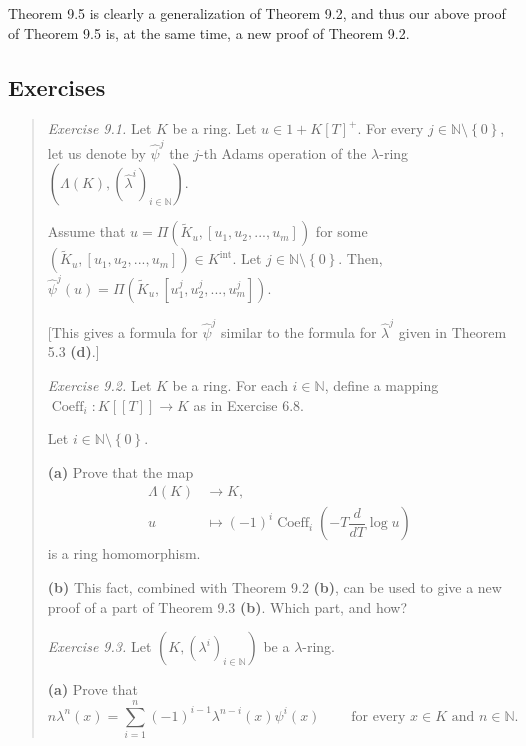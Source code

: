 \documentclass[numbers=enddot,12pt,final,onecolumn,notitlepage]{scrartcl}%
\begin{document}
Theorem 9.5 is clearly a generalization of Theorem 9.2, and thus our above
proof of Theorem 9.5 is, at the same time, a new proof of Theorem 9.2.

\subsection{Exercises}

\begin{quotation}
\textit{Exercise 9.1.} Let $K$ be a ring. Let $u\in1+K\left[  T\right]  ^{+}$.
For every $j\in\mathbb{N}\setminus\left\{  0\right\}  $, let us denote by
$\widehat{\psi}^{j}$ the $j$-th Adams operation of the $\lambda$-ring $\left(
\Lambda\left(  K\right)  ,\left(  \widehat{\lambda}^{i}\right)  _{i\in
\mathbb{N}}\right)  $.

Assume that $u=\Pi\left(  \widetilde{K}_{u},\left[  u_{1},u_{2},...,u_{m}%
\right]  \right)  $ for some $\left(  \widetilde{K}_{u},\left[  u_{1}%
,u_{2},...,u_{m}\right]  \right)  \in K^{\operatorname*{int}}$. Let
$j\in\mathbb{N}\setminus\left\{  0\right\}  $. Then, $\widehat{\psi}%
^{j}\left(  u\right)  =\Pi\left(  \widetilde{K}_{u},\left[  u_{1}^{j}%
,u_{2}^{j},...,u_{m}^{j}\right]  \right)  $.

[This gives a formula for $\widehat{\psi}^{j}$ similar to the formula for
$\widehat{\lambda}^{j}$ given in Theorem 5.3 \textbf{(d)}.]

\textit{Exercise 9.2.} Let $K$ be a ring. For each $i\in\mathbb{N}$, define a
mapping $\operatorname*{Coeff}\nolimits_{i}:K\left[  \left[  T\right]
\right]  \rightarrow K$ as in Exercise 6.8.

Let $i\in\mathbb{N}\setminus\left\{  0\right\}  $.

\textbf{(a)} Prove that the map%
\begin{align*}
\Lambda\left(  K\right)   &  \rightarrow K,\\
u  &  \mapsto\left(  -1\right)  ^{i}\operatorname*{Coeff}\nolimits_{i}\left(
-T\dfrac{d}{dT}\log u\right)
\end{align*}
is a ring homomorphism.

\textbf{(b)} This fact, combined with Theorem 9.2 \textbf{(b)}, can be used to
give a new proof of a part of Theorem 9.3 \textbf{(b)}. Which part, and how?

\textit{Exercise 9.3.} Let $\left(  K,\left(  \lambda^{i}\right)
_{i\in\mathbb{N}}\right)  $ be a $\lambda$-ring.

\textbf{(a)} Prove that%
\[
n\lambda^{n}\left(  x\right)  =\sum_{i=1}^{n}\left(  -1\right)  ^{i-1}%
\lambda^{n-i}\left(  x\right)  \psi^{i}\left(  x\right)
\ \ \ \ \ \ \ \ \ \ \text{for every }x\in K\text{ and }n\in\mathbb{N}\text{.}%
\]



\end{quotation}
\end{document}
